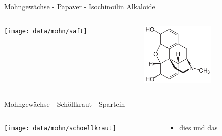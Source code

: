 \begin{frame}[t,label=mohn]{Mohngewächse - Papaver - Isochinoilin Alkaloide }
  \begin{columns}[onlytextwidth,t]
    \begin{column}{0.6\textwidth}
      \begin{minipage}[c][0.9\textheight][l]{\linewidth}
        \texttt{[image: data/mohn/saft]}%
      \end{minipage}
    \end{column}
    \begin{column}{0.4\textwidth}
      \begin{minipage}[c][0.9\textheight][l]{\linewidth}
        \includegraphics[height=3cm]{data/mohn/morphine}%
      \end{minipage}
    \end{column}
  \end{columns}
\end{frame}
\begin{frame}[t,label=schoellkraut]{Mohngewächse - Schöllkraut - Spartein }
  \begin{columns}[onlytextwidth,t]
    \begin{column}{0.6\textwidth}
      \begin{minipage}[c][0.9\textheight][l]{\linewidth}
        \texttt{[image: data/mohn/schoellkraut]}%
      \end{minipage}
    \end{column}
    \begin{column}{0.4\textwidth}
      \begin{minipage}[c][0.9\textheight][l]{\linewidth}
        \begin{itemize}
          \item dies und das 
        \end{itemize}   
      \end{minipage}
    \end{column}
  \end{columns}


\end{frame}
